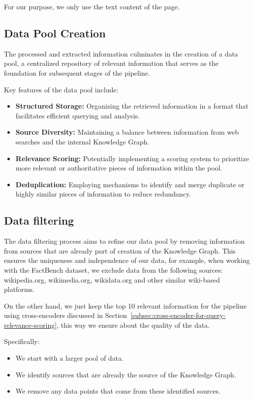 For our purpose, we only use the text content of the page.
\subsection{Data Pool Creation}\label{subsec:data-pool-creation}
The processed and extracted information culminates in the creation of a data pool, a centralized repository of relevant information that serves as the foundation for subsequent stages of the pipeline.

Key features of the data pool include:
\begin{itemize}
    \item \textbf{Structured Storage:} Organizing the retrieved information in a format that facilitates efficient querying and analysis.
    \item \textbf{Source Diversity:} Maintaining a balance between information from web searches and the internal Knowledge Graph.
    \item \textbf{Relevance Scoring:} Potentially implementing a scoring system to prioritize more relevant or authoritative pieces of information within the pool.
    \item \textbf{Deduplication:} Employing mechanisms to identify and merge duplicate or highly similar pieces of information to reduce redundancy.
\end{itemize}
\subsection{Data filtering}\label{subsec:data-filtering}
The data filtering process aims to refine our data pool by removing information from sources that are already part of creation of the Knowledge Graph.
This ensures the uniqueness and independence of our data, for example, when working with the FactBench dataset, we exclude data from the following sources: wikipedia.org, wikimedia.org, wikidata.org and other similar wiki-based platforms.

On the other hand, we just keep the top 10 relevant information for the pipeline using cross-encoders discussed in Section~\ref{subsec:cross-encoder-for-query-relevance-scoring}, this way we ensure about the quality of the data.

Specifically:
\begin{itemize}
    \item We start with a larger pool of data.
    \item We identify sources that are already the source of the Knowledge Graph.
    \item We remove any data points that come from these identified sources.
\end{itemize}

